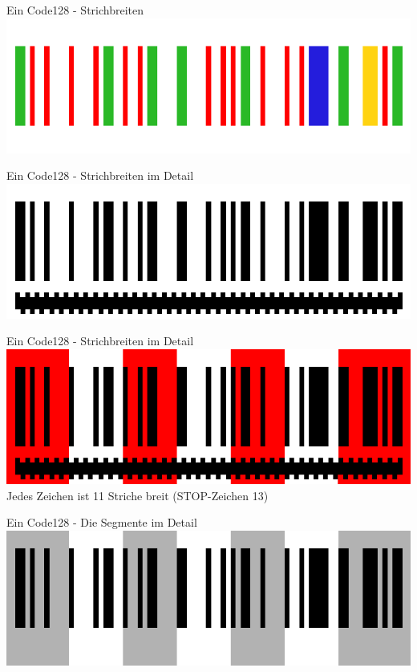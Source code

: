 \begin{frame}{Ein Code128 - Strichbreiten}
	\hfill\includegraphics[width=.95\textwidth]{muzy/cake_2.png}\hfill\hbox{}
\end{frame}

\begin{frame}{Ein Code128 - Strichbreiten im Detail}
	\hfill\includegraphics[width=.95\textwidth]{muzy/cake_4.png}\hfill\hbox{}
\end{frame}

\begin{frame}{Ein Code128 - Strichbreiten im Detail}
	\hfill\includegraphics[width=.95\textwidth]{muzy/cake_5.png}\hfill\hbox{}
	\hfill Jedes Zeichen ist 11 Striche breit (STOP-Zeichen 13) \hfill\hbox{}
\end{frame}

\begin{frame}{Ein Code128 - Die Segmente im Detail}
	\hfill\includegraphics[width=.95\textwidth]{muzy/cake_6.png}\hfill\hbox{}
\end{frame}

